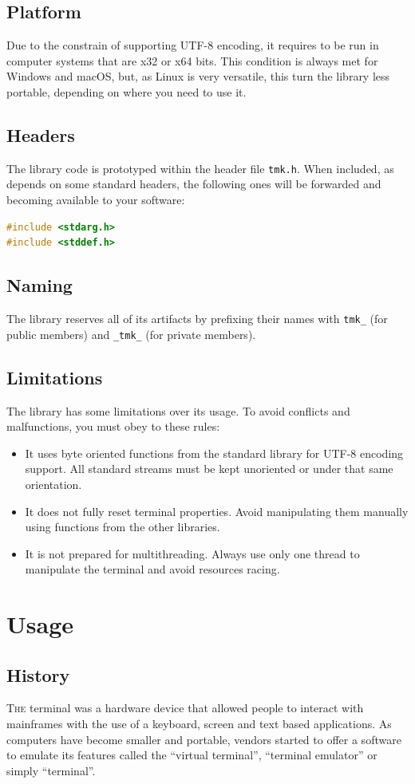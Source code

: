 \documentclass{report}
\newcommand{\flmcap}[2]{\lettrine{\color{flmred}#1}{#2}}
\begin{document}
\section{Platform}
Due to the constrain of supporting UTF-8 encoding, it requires to be run in computer systems that are x32 or x64 bits. This condition is always met for Windows and macOS, but, as Linux is very versatile, this turn the library less portable, depending on where you need to use it.
\section{Headers}
The library code is prototyped within the header file \texttt{tmk.h}. When included, as depends on some standard headers, the following ones will be forwarded and becoming available to your software:
\begin{lstlisting}[language=c,caption=the headers forwarded by the library.]
#include <stdarg.h>
#include <stddef.h>
\end{lstlisting}
\section{Naming}
The library reserves all of its artifacts by prefixing their names with \texttt{tmk\_} (for public members) and \texttt{\_tmk\_} (for private members).
\section{Limitations}
The library has some limitations over its usage. To avoid conflicts and malfunctions, you must obey to these rules:
\begin{itemize}
  \item  It uses byte oriented functions from the standard library for UTF-8 encoding support. All standard streams must be kept unoriented or under that same orientation.
  \item It does not fully reset terminal properties. Avoid manipulating them manually using functions from the other libraries.
  \item It is not prepared for multithreading. Always use only one thread to manipulate the terminal and avoid resources racing.
\end{itemize}
\chapter{Usage}
\section{History}
\flmcap{T}{he} terminal was a hardware device that allowed people to interact with mainframes with the use of a keyboard, screen and text based applications. As computers have become smaller and portable, vendors started to offer a software to emulate its features called the ``virtual terminal'', ``terminal emulator'' or simply ``terminal''.
\end{document}
